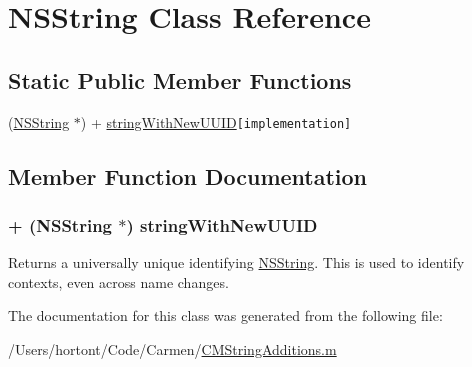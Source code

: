 \hypertarget{class_n_s_string}{
\section{NSString Class Reference}
\label{class_n_s_string}
}
\subsection*{Static Public Member Functions}
\begin{CompactItemize}
\item 
(\hyperlink{class_n_s_string}{NSString} $\ast$) + \hyperlink{class_n_s_string_268d30c941ff10298a42ece33e45fd56}{stringWithNewUUID}{\tt  \mbox{[}implementation\mbox{]}}
\end{CompactItemize}


\subsection{Member Function Documentation}
\hypertarget{class_n_s_string_268d30c941ff10298a42ece33e45fd56}{
\subsubsection[stringWithNewUUID]{\setlength{\rightskip}{0pt plus 5cm}+ ({\bf NSString} $\ast$) stringWithNewUUID }}
\label{class_n_s_string_268d30c941ff10298a42ece33e45fd56}


Returns a universally unique identifying \hyperlink{class_n_s_string}{NSString}. This is used to identify contexts, even across name changes. 

The documentation for this class was generated from the following file:\begin{CompactItemize}
\item 
/Users/hortont/Code/Carmen/\hyperlink{_c_m_string_additions_8m}{CMStringAdditions.m}\end{CompactItemize}
